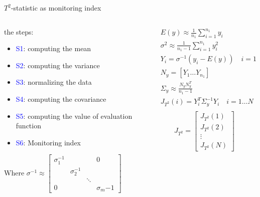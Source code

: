 \documentclass[10pt]{beamer}
\begin{document}
\begin{frame}{$T^2$-statistic as monitoring index}
    \begin{columns}
        \begin{column}{0.5\textwidth}
            the steps: %
      \begin{itemize}
      \item \textcolor{blue}{S1}: computing the mean \\
      \item \textcolor{blue}{S2}: computing the variance
      \item \textcolor{blue}{S3}: normalizing the data
      \item \textcolor{blue}{S4}: computing the  covariance
      \item \textcolor{blue}{S5}: computing the value of evaluation function
      \item \textcolor{blue}{S6}: Monitoring index
 	 \end{itemize}  
 	 Where 
  $
                \sigma^{-1} \approx
                \begin{bmatrix}
                \sigma_1^{-1} &&&0\\
                &  \sigma_2^{-1} && \\
                && \ddots & \\
                0&&& \sigma_m{-1}
                \end{bmatrix}
  $ 
        \end{column}
        \begin{column}{0.5\textwidth}  %
      \begin{equation} \nonumber
               \begin{aligned}
                  & E(y) \approx \frac{1}{n_1}\sum_{i=1}^{n_1}y_i  \\
                  & \sigma^2 \approx \frac{1}{n_1-1}\sum_{i=1}^{n_1}y_i^2 \\
                  &  Y_i = \sigma^{-1}(y_i-E(y)) \quad i = 1\dots N \\
                  &  N_y = [Y_1 \dots Y_{n_1}] \\
                  & \Sigma_y \approx \frac{N_yN_y^T}{n_1-1} \\
                  & J_{T^2}(i) = Y_i^T\Sigma_y^{-1}Y_i \quad i = 1\dots N\\  
             \end{aligned}
     \end{equation}
      \begin{equation} \nonumber
                  J_{T^2} =  \begin{bmatrix}
                          J_{T^2}(1) \\
                          J_{T^2}(2) \\
                          \vdots      \\
                           J_{T^2}(N)
                         \end{bmatrix}
                         \label{Jt}
                \end{equation}
        \end{column}
    \end{columns}
\end{frame}
\end{document}
